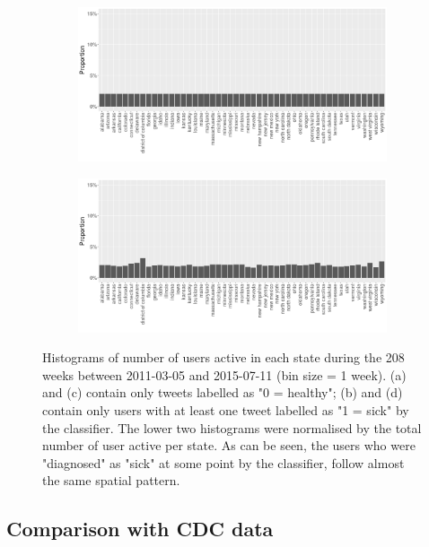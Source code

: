 \documentclass[11pt, a4paper]{article}\usepackage[]{graphicx}\usepackage[]{color}
\begin{document}
\begin{figure}[h]
    \begin{subfigure}[t]{0.49\textwidth}
  \includegraphics[width=1\linewidth]{activity_rel_healthy_user_statename_Twitter_full_aggregated.png}
  \caption{}
  \end{subfigure}
  \hfill
    \begin{subfigure}[t]{0.49\textwidth}
  \includegraphics[width=1\linewidth]{activity_rel_sick_user_statename_Twitter_full_aggregated.png}
  \caption{}
  \end{subfigure}
  \caption{Histograms of number of users active in each state during the 208 weeks between 2011-03-05 and 2015-07-11 (bin size = 1 week). (a) and (c) contain only tweets labelled as "0 = healthy"; (b) and (d) contain only users with at least one tweet labelled as "1 = sick" by the classifier. The lower two histograms were normalised by the total number of user active per state. As can be seen, the users who were "diagnosed" as "sick" at some point by the classifier, follow almost the same spatial pattern.}
  \label{fig:tweets_state_healthy_sick_user}
\end{figure}

\subsection{Comparison with CDC data}
\label{sec:comp_cdc}
\end{document}
